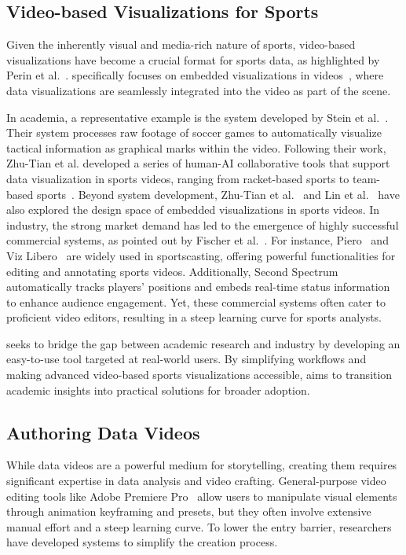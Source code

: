 \subsection{Video-based Visualizations for Sports}
Given the inherently visual and media-rich nature of sports, 
video-based visualizations have become a crucial format for sports data, 
as highlighted by Perin et al.~\cite{DBLP:journals/cgf/PerinVSSWC18}. 
\SB{} specifically focuses on embedded visualizations in videos~\cite{DBLP:journals/tvcg/WillettJD17}, where data visualizations are seamlessly integrated into the video as part of the scene.

In academia, a representative example is the system developed by Stein et al.~\cite{DBLP:journals/tvcg/SteinJLBZGSAGK18}. 
Their system processes raw footage of soccer games to automatically visualize tactical information as graphical marks within the video. 
Following their work,
Zhu-Tian et al. developed a series of human-AI collaborative tools that support data visualization in sports videos, ranging from racket-based sports\cite{chen2021augmenting, chen2022sporthesia} to team-based sports~\cite{chen2023iball}. 
Beyond system development, Zhu-Tian et al.~\cite{chen2021augmenting} and Lin et al.~\cite{lin2022quest} have also explored the design space of embedded visualizations in sports videos.
In industry, the strong market demand has led to the emergence of highly successful commercial systems, as pointed out by Fischer et al.~\cite{DBLP:journals/corr/abs-2105-04875}. 
For instance, Piero~\cite{piero} and Viz Libero~\cite{viz-libero} are widely used in sportscasting, offering powerful functionalities for editing and annotating sports videos. 
Additionally, Second Spectrum~\cite{secondspectrum} automatically tracks players' positions and embeds real-time status information to enhance audience engagement.
Yet, these commercial systems often cater to proficient video editors, resulting in a steep learning curve for sports analysts. 

\SB{} seeks to bridge the gap between academic research and industry by developing an easy-to-use tool targeted at real-world users. 
By simplifying workflows and making advanced video-based sports visualizations accessible, 
\SB{} aims to transition academic insights into practical solutions for broader adoption.

\subsection{Authoring Data Videos}
While data videos are a powerful medium for storytelling, creating them requires significant expertise in data analysis and video crafting. General-purpose video editing tools like Adobe Premiere Pro~\cite{premiere} allow users to manipulate visual elements through animation keyframing and presets, but they often involve extensive manual effort and a steep learning curve. 
To lower the entry barrier, researchers have developed systems to simplify the creation process.

